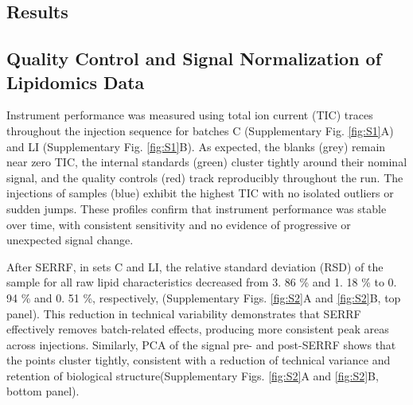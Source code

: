 \documentclass[10pt,letterpaper]{article}
\begin{document}
\begin{itemize}
\section*{Results}

\subsection*{Quality Control and Signal Normalization of Lipidomics Data}
Instrument performance was measured using total ion current (TIC) traces throughout the injection sequence for batches C (Supplementary Fig. \ref{fig:S1}A) and LI (Supplementary Fig. \ref{fig:S1}B). As expected, the blanks (grey) remain near zero TIC, the internal standards (green) cluster tightly around their nominal signal, and the quality controls (red) track reproducibly throughout the run. The injections of samples (blue) exhibit the highest TIC with no isolated outliers or sudden jumps. These profiles confirm that instrument performance was stable over time, with consistent sensitivity and no evidence of progressive or unexpected signal change.

After SERRF, in sets C and LI, the relative standard deviation (RSD) of the sample  for all raw lipid characteristics decreased from 3. 86 \% and 1. 18 \%  to 0. 94 \% and 0. 51 \%, respectively,  (Supplementary Figs. \ref{fig:S2}A and \ref{fig:S2}B, top panel). This reduction in technical variability demonstrates that SERRF effectively removes batch-related effects, producing more consistent peak areas across injections. Similarly, PCA of the signal pre- and post-SERRF shows that the points cluster tightly, consistent with a reduction of technical variance and retention of biological structure(Supplementary Figs. \ref{fig:S2}A and \ref{fig:S2}B, bottom panel).


\end{itemize}
\end{document}
